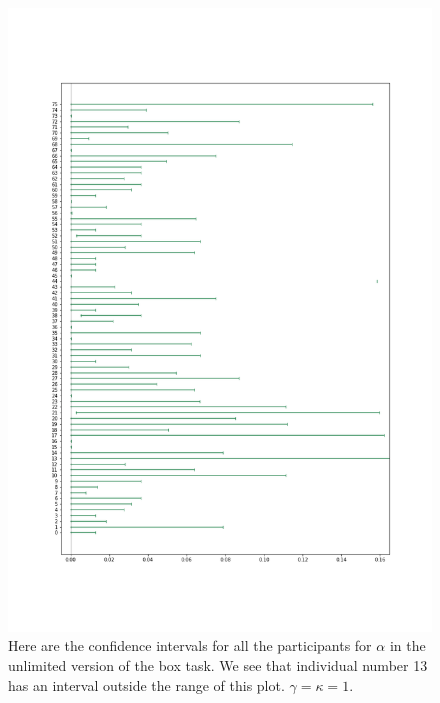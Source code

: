 \begin{figure}
    \centering
    \includegraphics[scale=0.37]{pictures/all_cis_unlim_alpha.png}
    \caption[CIs for $\alpha$, unlimited. $\gamma=\kappa=1$]{Here are the confidence intervals for all the participants for $\alpha$ in the unlimited version of the box task. We see that individual number 13 has an interval outside the range of this plot. $\gamma=\kappa=1$.}
    \label{fig:all_cis_alpha_unlim_v2}
\end{figure}



